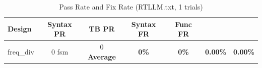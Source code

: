 \begin{table}[h]
\centering
\caption{Pass Rate and Fix Rate (RTLLM.txt, 1 trials)}
\begin{tabular}{l|cc|cc}
  \hline
  Design & Syntax PR & TB PR & Syntax FR & Func FR \\
  \hline
  freq_div & 0%
  fsm & 0%
  \hline
  \textbf{Average} & \textbf{0\%} & \textbf{0\%} & \textbf{0.00\%} & \textbf{0.00\%} \\
  \hline
\end{tabular}
\end{table}